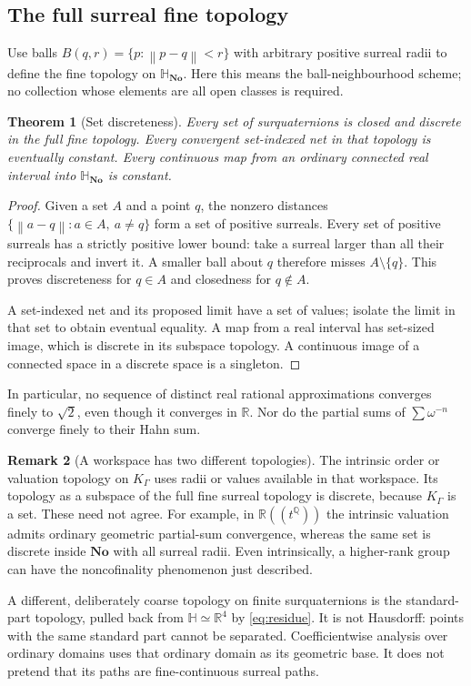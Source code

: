 \documentclass[11pt,letterpaper]{article}
\newtheorem{theorem}{Theorem}[section]
\theoremstyle{definition}
\newtheorem{remark}[theorem]{Remark}
\newcommand{\No}{\mathbf{No}}
\newcommand{\R}{\mathbb R}
\newcommand{\Q}{\mathbb Q}
\newcommand{\HH}{\mathbb H}
\newcommand{\SQ}{\mathbb H_{\No}}
\newcommand{\norm}[1]{\left\lVert#1\right\rVert}
\begin{document}
\subsection{The full surreal fine topology}
Use balls $B(q,r)=\{p:\norm{p-q}<r\}$ with arbitrary positive surreal radii to
define the fine topology on $\SQ$. Here this means the ball-neighbourhood
scheme; no collection whose elements are all open classes is required.

\begin{theorem}[Set discreteness]
\label{thm:fine}
Every set of surquaternions is closed and discrete in the full fine topology.
Every convergent set-indexed net in that topology is eventually constant.
Every continuous map from an ordinary connected real interval into $\SQ$ is
constant.
\end{theorem}
\begin{proof}
Given a set $A$ and a point $q$, the nonzero distances
$\{\norm{a-q}:a\in A,\ a\ne q\}$ form a set of positive surreals. Every set of
positive surreals has a strictly positive lower bound: take a surreal larger
than all their reciprocals and invert it. A smaller ball about $q$ therefore
misses $A\setminus\{q\}$. This proves discreteness for $q\in A$ and closedness
for $q\notin A$.

A set-indexed net and its proposed limit have a set of values; isolate the
limit in that set to obtain eventual equality. A map from a real interval has
set-sized image, which is discrete in its subspace topology. A continuous image
of a connected space in a discrete space is a singleton.
\end{proof}
In particular, no sequence of distinct real rational approximations converges
finely to $\sqrt2$, even though it converges in $\R$. Nor do the partial sums of
$\sum\omega^{-n}$ converge finely to their Hahn sum.

\begin{remark}[A workspace has two different topologies]
The intrinsic order or valuation topology on $K_\Gamma$ uses radii or values
available in that workspace. Its topology as a subspace of the full fine
surreal topology is discrete, because $K_\Gamma$ is a set. These need not agree.
For example, in $\R((t^\Q))$ the intrinsic valuation admits ordinary geometric
partial-sum convergence, whereas the same set is discrete inside $\No$ with
all surreal radii. Even intrinsically, a higher-rank group can have the
noncofinality phenomenon just described.
\end{remark}
A different, deliberately coarse topology on finite surquaternions is the
standard-part topology, pulled back from $\HH\simeq\R^4$ by \eqref{eq:residue}.
It is not Hausdorff: points with the same standard part cannot be separated.
Coefficientwise analysis over ordinary domains uses that ordinary domain as
its geometric base. It does not pretend that its paths are fine-continuous
surreal paths.
\end{document}
